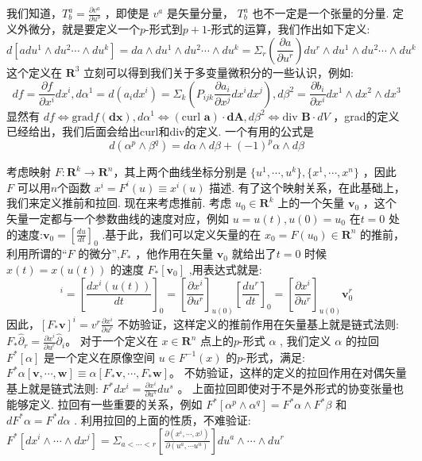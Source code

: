 \documentclass[supercite]{HustGraduPaper}
\begin{document}
\begin{appendices}
		我们知道，$ T_b^a = \frac{\partial v^a}{\partial u^b}$ ，即使是 $v^a$ 是矢量分量， $T^a_b$ 也不一定是一个张量的分量. 定义外微分，就是要定义一个$p$-形式到$p+1$-形式的运算，我们作出如下定义:
		\begin{equation}
		d[adu^1\wedge du^2 \cdots \wedge du^k] = da \wedge du^1\wedge du^2 \cdots \wedge du^k =\Sigma_r (\frac{\partial a}{\partial u^r})du^r\wedge du^1\wedge du^2 \cdots \wedge du^k 
		\end{equation}
		这个定义在 $\mathbf{R}^3$ 立刻可以得到我们关于多变量微积分的一些认识，例如:
		\begin{equation}
		df = \frac{\partial f}{\partial x^i} dx^i  , d\alpha^1 = d(a_i dx^i) = \Sigma_k(P_{ijk}  \frac{\partial a_i}{\partial x^j} dx^i dx^j) , d\beta^2 = \frac{\partial b_i}{\partial x^i} dx^1 \wedge dx^2 \wedge dx^3 
		\end{equation}
		显然有 $df \Leftrightarrow \text{grad}f (\mathbf{dx}), d\alpha^1 \Leftrightarrow (\text{curl } \mathbf{a}) \cdot \mathbf{dA}, d\beta^2 \Leftrightarrow  \text{div } \mathbf{B} \cdot dV$  ，grad的定义已经给出，我们后面会给出curl和div的定义.
		一个有用的公式是 \begin{equation}
		d(\alpha^p \wedge \beta^q) = d\alpha \wedge d\beta + (-1)^p \alpha \wedge d\beta 
		\end{equation}
		
		考虑映射 $F: \mathbf{R} ^k \to \mathbf{R}^n $，其上两个曲线坐标分别是 $\{ u^1, \cdots ,u^k\},\{ x^1, \cdots ,x^n\}$ ，因此 $F$ 可以用$n$个函数 $x^i = F^i(u) \equiv x^i(u)$ 描述. 有了这个映射关系，在此基础上，我们来定义推前和拉回.
		现在来考虑推前. 考虑 $u_0 \in \mathbf{R}^k$ 上的一个矢量 $\mathbf{v}_0$ ，这个矢量一定都与一个参数曲线的速度对应，例如 $u = u(t) , u(0) = u_0$ 在$ t = 0$ 处的速度:$ \mathbf{v}_0 = [\frac{du}{dt}]_0$ .基于此，我们可以定义矢量的在 $x_0 = F(u_0) \in \mathbf{R}^n$ 的推前，利用所谓的“$F$ 的微分”,$ F_*$ ，他作用在矢量 $\mathbf{v}_0$ 就给出了$ t = 0$ 时候 $x(t) = x(u(t))$ 的速度 $F_*[\mathbf{v}_0]$ ,用表达式就是:
\begin{equation}
		[F_*\mathbf{v}_0]^i = [\frac{dx^i(u(t))}{dt}]_0 = [\frac{\partial x^i}{\partial u^r}]_{u(0)} [\frac{du^r}{dt}]_0=[\frac{\partial x^i}{\partial u^r}]_{u(0)}  \mathbf{v}_0^r
\end{equation}
因此，$ [F_* \mathbf{v}]^i = v^r\frac{\partial x^i}{\partial u^r}$
		不妨验证，这样定义的推前作用在矢量基上就是链式法则:
		$F_*\hat\partial_r = \frac{\partial x^i}{\partial u^r} \hat \partial _i $。
		对于一个定义在 $x \in \mathbf{R}^n$ 点上的$p$-形式 $\alpha$ , 我们定义 $\alpha$ 的拉回 $F^*[\alpha]$  是一个定义在原像空间 $u \in F^{-1} (x)$ 的$p$-形式，满足:
		$F^* \alpha [\mathbf{v},\cdots,\mathbf{w}] \equiv \alpha[F_*\mathbf{v},\cdots, F_*\mathbf{w}] $。
		不妨验证，这样的定义的拉回作用在对偶矢量基上就是链式法则:
		$F^*dx^i = \frac{\partial x^i}{\partial u^s} du^s$ 。
		上面拉回即使对于不是外形式的协变张量也能够定义.
		拉回有一些重要的关系，例如 $F^*[\alpha^p \wedge \alpha^q] = F^*\alpha \wedge F^* \beta$ 和$ dF^* \alpha = F^* d\alpha$ .
		利用拉回的上面的性质，不难验证:
		$F^*[dx^i \wedge \cdots \wedge dx^j] = \Sigma_{a<\cdots < r} [\frac{\partial(x^i,\cdots,x^j)}{\partial (u^a,\cdots u^u)}] du^a\wedge \cdots \wedge du^r $
		

\end{appendices}
\end{document}
